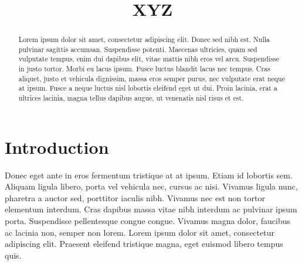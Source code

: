 \usepackage[letterpaper, top=0.75in, bottom=0.80in, inner=0.75in, outer=0.75in, columnsep=2pc, foot=.15in]{geometry}

\usepackage[%
            hyperfigures=false,
            hyperindex=false,
            pdfborder={ 0 0 0 },
            pdftitle={XYZ},
            pdfauthor={},
            pdfkeywords={}]{hyperref}
\usepackage{boxedminipage}

\usepackage[small,bf]{caption}


\title{XYZ}


\maketitle

\begin{abstract}
Lorem ipsum dolor sit amet, consectetur adipiscing elit. Donec sed nibh est. Nulla pulvinar sagittis accumsan. Suspendisse potenti. Maecenas ultricies, quam sed vulputate tempus, enim dui dapibus elit, vitae mattis nibh eros vel arcu. Suspendisse in justo tortor. Morbi eu lacus ipsum. Fusce luctus blandit lacus nec tempus. Cras aliquet, justo et vehicula dignissim, massa eros semper purus, nec vulputate erat neque at ipsum. Fusce a neque luctus nisl lobortis eleifend eget ut dui. Proin lacinia, erat a ultrices lacinia, magna tellus dapibus augue, ut venenatis nisl risus et est.
\end{abstract}

\section{Introduction}
\label{sec:introduction}
Donec eget ante in eros fermentum tristique at at ipsum. Etiam id lobortis sem. Aliquam ligula libero, porta vel vehicula nec, cursus ac nisi. Vivamus ligula nunc, pharetra a auctor sed, porttitor iaculis nibh. Vivamus nec est non tortor elementum interdum. Cras dapibus massa vitae nibh interdum ac pulvinar ipsum porta. Suspendisse pellentesque congue congue. Vivamus magna dolor, faucibus ac lacinia non, semper non lorem. Lorem ipsum dolor sit amet, consectetur adipiscing elit. Praesent eleifend tristique magna, eget euismod libero tempus quis.


